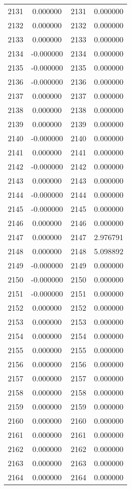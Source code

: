 \documentclass[12pt]{article}
\begin{document}
\begin{longtable}{@{}cccc@{}}
2131 & 0.000000 & 2131 & 0.000000 \\
2132 & 0.000000 & 2132 & 0.000000 \\
2133 & 0.000000 & 2133 & 0.000000 \\
2134 & -0.000000 & 2134 & 0.000000 \\
2135 & -0.000000 & 2135 & 0.000000 \\
2136 & -0.000000 & 2136 & 0.000000 \\
2137 & 0.000000 & 2137 & 0.000000 \\
2138 & 0.000000 & 2138 & 0.000000 \\
2139 & 0.000000 & 2139 & 0.000000 \\
2140 & -0.000000 & 2140 & 0.000000 \\
2141 & 0.000000 & 2141 & 0.000000 \\
2142 & -0.000000 & 2142 & 0.000000 \\
2143 & 0.000000 & 2143 & 0.000000 \\
2144 & -0.000000 & 2144 & 0.000000 \\
2145 & -0.000000 & 2145 & 0.000000 \\
2146 & 0.000000 & 2146 & 0.000000 \\
2147 & 0.000000 & 2147 & 2.976791 \\
2148 & 0.000000 & 2148 & 5.098892 \\
2149 & -0.000000 & 2149 & 0.000000 \\
2150 & -0.000000 & 2150 & 0.000000 \\
2151 & -0.000000 & 2151 & 0.000000 \\
2152 & 0.000000 & 2152 & 0.000000 \\
2153 & 0.000000 & 2153 & 0.000000 \\
2154 & 0.000000 & 2154 & 0.000000 \\
2155 & 0.000000 & 2155 & 0.000000 \\
2156 & 0.000000 & 2156 & 0.000000 \\
2157 & 0.000000 & 2157 & 0.000000 \\
2158 & 0.000000 & 2158 & 0.000000 \\
2159 & 0.000000 & 2159 & 0.000000 \\
2160 & 0.000000 & 2160 & 0.000000 \\
2161 & 0.000000 & 2161 & 0.000000 \\
2162 & 0.000000 & 2162 & 0.000000 \\
2163 & 0.000000 & 2163 & 0.000000 \\
2164 & 0.000000 & 2164 & 0.000000 \\

\end{longtable}
\end{document}
